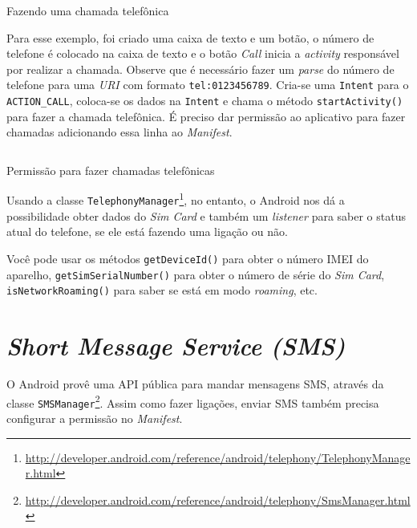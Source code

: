 \documentclass[a4paper,12pt,brazil,oneside]{book}
\begin{document}
\begin{singlespace}
		\begin{listing}[H]
		\inputminted[linenos=true,fontsize=\small,frame=lines, framesep=2mm, tabsize=2,numbersep=5pt]{java}{src/api/comm/phonecall.java}
		\caption{Fazendo uma chamada telefônica}
		\label{code:phonecall}
		\end{listing} 

		Para esse exemplo, foi criado uma caixa de texto e um botão, o número de telefone é colocado na caixa de texto e o botão \emph{Call} inicia a \emph{activity} responsável por realizar a chamada. Observe que é necessário fazer um \emph{parse} do número de telefone para uma \emph{URI} com formato \texttt{tel:0123456789}. Cria-se uma \texttt{Intent} para o \texttt{ACTION\_CALL}, coloca-se os dados na \texttt{Intent} e chama o método \texttt{startActivity()} para fazer a chamada telefônica. É preciso dar permissão ao aplicativo para fazer chamadas adicionando essa linha ao \emph{Manifest}.
	
		\begin{listing}[H]
		\inputminted[linenos=true,fontsize=\small,frame=lines, framesep=2mm, tabsize=2,numbersep=5pt]{xml}{src/api/comm/phonecall-perm.xml}
		\caption{Permissão para fazer chamadas telefônicas}
		\label{code:phonecall-perm}
		\end{listing} 		

		Usando a classe \texttt{TelephonyManager}\footnote{\href{http://developer.android.com/reference/android/telephony/TelephonyManager.html}{http://developer.android.com/reference/android/telephony/TelephonyManager.html}}, no entanto, o Android nos dá a possibilidade obter dados do \emph{Sim Card} e também um \emph{listener} para saber o status atual do telefone, se ele está fazendo uma ligação ou não.

		Você pode usar os métodos \texttt{getDeviceId()} para obter o número IMEI do aparelho, \texttt{getSimSerialNumber()} para obter o número de série do \emph{Sim Card}, \texttt{isNetworkRoaming()} para saber se está em modo \emph{roaming}, etc.

	\section{\emph{Short Message Service (SMS)}}

		O Android provê uma API pública para mandar mensagens SMS, através da classe \texttt{SMSManager}\footnote{\href{http://developer.android.com/reference/android/telephony/SmsManager.html}{http://developer.android.com/reference/android/telephony/SmsManager.html}}. Assim como fazer ligações, enviar SMS também precisa configurar a permissão no \emph{Manifest}.


\end{singlespace}
\end{document}
